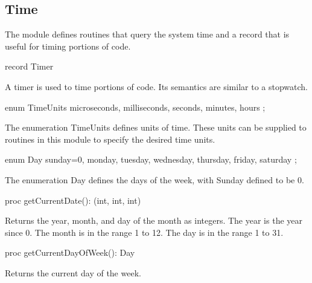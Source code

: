 \subsection{Time}
\label{Time}

The module  defines routines that query the system time and
a record  that is useful for timing portions of code.

\vspace{1pc}

\begin{protohead}
record Timer
\end{protohead}
\begin{protobody}
A timer is used to time portions of code.  Its semantics are similar
to a stopwatch.
\end{protobody}

\begin{protohead}
enum TimeUnits { microseconds, milliseconds, seconds, minutes, hours };
\end{protohead}
\begin{protobody}
The enumeration TimeUnits defines units of time.  These units can be
supplied to routines in this module to specify the desired time units.
\end{protobody}

\begin{protohead}
enum Day { sunday=0, monday, tuesday, wednesday, thursday, friday, saturday };
\end{protohead}
\begin{protobody}
The enumeration Day defines the days of the week, with Sunday defined to be 0.
\end{protobody}


\begin{protohead}
proc getCurrentDate(): (int, int, int)
\end{protohead}
\begin{protobody}
Returns the year, month, and day of the month as integers.  The year
is the year since 0.  The month is in the range 1 to 12.  The day is
in the range 1 to 31.
\end{protobody}

\begin{protohead}
proc getCurrentDayOfWeek(): Day
\end{protohead}
\begin{protobody}
Returns the current day of the week.
\end{protobody}

